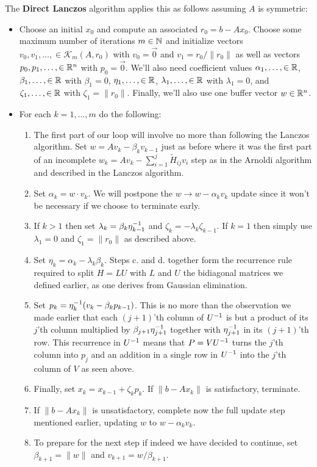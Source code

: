 \documentclass[11pt]{article}
\begin{document}
The \textbf{Direct Lanczos} algorithm applies this as follows assuming $A$ is symmetric: \begin{itemize}
\item Choose an initial $x_0$ and compute an associated $r_0 = b - Ax_0$. Choose some maximum number of iterations $m \in \mathbb{N}$ and initialize vectors $v_0,v_1, \dots, \in \mathcal K_m (A,r_0)$ with $v_0 = \vec 0$ and $v_1 = r_0 / \lVert r_0 \rVert $ as well as vectors $p_0,p_1, \dots, \in \mathbb{R}^n$ with $p_0 = \vec 0$. We'll also need coefficient values $\alpha_1, \dots, \in \mathbb{R}$, $\beta_1,\dots, \in \mathbb{R}$ with $\beta_1 = 0$, $\eta_1,\dots, \in \mathbb{R}$, $\lambda_1, \dots, \in \mathbb{R}$ with $\lambda_1= 0$, and $\zeta_1,\dots, \in \mathbb{R}$ with $\zeta_1 = \lVert r_0 \rVert$. Finally, we'll also use one buffer vector $w \in \mathbb{R}^n$.
\item For each $k = 1, \dots, m$ do the following: \begin{enumerate}
	\item The first part of our loop will involve no more than following the Lanczos algorithm. Set $w = A v_k - \beta_k v_{k-1}$ just as before where it was the first part of an incomplete $w_k = A v_k - \sum_{i=1}^j \tilde H_{ij} v_i $ step as in the Arnoldi algorithm and described in the Lanczos algorithm.
	\item Set $\alpha_k = w \cdot v_k $. We will postpone the $w \to w - \alpha_k v_k$ update since it won't be necessary if we choose to terminate early.
	\item If $k > 1$ then set $\lambda_k = \beta_k \eta_{k-1}^{-1} $ and $\zeta_k = -\lambda_k \zeta_{k-1}$. If $k=1$ then simply use $\lambda_1 = 0$ and $\zeta_1 = \lVert r_0 \rVert$ as described above.
	\item Set $\eta_k = \alpha_k - \lambda_k \beta_k$. Steps c. and d. together form the recurrence rule required to split $H = LU$ with $L$ and $U$ the bidiagonal matrices we defined earlier, as one derives from Gaussian elimination.
	\item Set $p_k = \eta_k^{-1} (v_k - \beta_k p_{k-1})$. This is no more than the observation we made earlier that each $(j+1)$'th column of $U^{-1}$ is but a product of its $j$'th column multiplied by $\beta_{j+1} \eta_{j+1}^{-1}$ together with $\eta_{j+1}^{-1}$ in its $(j+1)$'th row. This recurrence in $U^{-1}$ means that $P = VU^{-1}$ turns the $j$'th column into $p_j$ and an addition in a single row in $U^{-1}$ into the $j$'th column of $V$ as seen above.
	\item Finally, set $x_k = x_{k-1} + \zeta_k p_k$. If $\lVert b - Ax_k \rVert$ is satisfactory, terminate.
	\item If $\lVert b - Ax_k \rVert$ is unsatisfactory, complete now the full update step mentioned earlier, updating $w$ to $w - \alpha_k v_k$.
	\item To prepare for the next step if indeed we have decided to continue, set $\beta_{k+1} = \lVert w \rVert$ and $v_{k+1} = w / \beta_{k+1}$. 
\end{enumerate}
\end{itemize}
\end{document}
